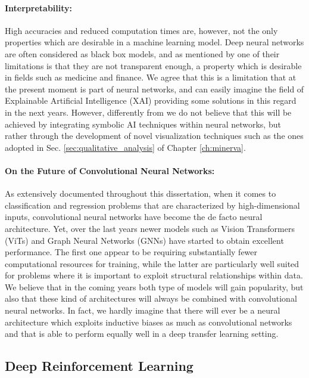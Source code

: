 \paragraph{Interpretability:}
High accuracies and reduced computation times are, however, not the only properties which are desirable in a machine learning model. Deep neural networks are often considered as black box models, and as mentioned by \citet{marcus2018deep} one of their limitations is that they are not transparent enough, a property which is desirable in fields such as medicine and finance. We agree that this is a limitation that at the present moment is part of neural networks, and can easily imagine the field of Explainable Artificial Intelligence (XAI) providing some solutions in this regard in the next years. However, differently from \cite{adadi2021survey} we do not believe that this will be achieved by integrating symbolic AI techniques within neural networks, but rather through the development of novel visualization techniques such as the ones adopted in Sec. \ref{sec:qualitative_analysis} of Chapter \ref{ch:minerva}. 

\paragraph{On the Future of Convolutional Neural Networks:}
As extensively documented throughout this dissertation, when it comes to classification and regression problems that are characterized by high-dimensional inputs, convolutional neural networks have become the de facto neural architecture. Yet, over the last years newer models such as Vision Transformers (ViTs) \cite{dosovitskiy2020image} and Graph Neural Networks (GNNs) \cite{scarselli2008graph,kipf2016semi,garcia2017few,scarselli2005graph} have started to obtain excellent performance. The first one appear to be requiring substantially fewer computational resources for training, while the latter are particularly well suited for problems where it is important to exploit structural relationships within data. We believe that in the coming years both type of models will gain popularity, but also that these kind of architectures will always be combined with convolutional neural networks. In fact, we hardly imagine that there will ever be a neural architecture which exploits inductive biases as much as convolutional networks and that is able to perform equally well in a deep transfer learning setting.   

\subsection{Deep Reinforcement Learning}
